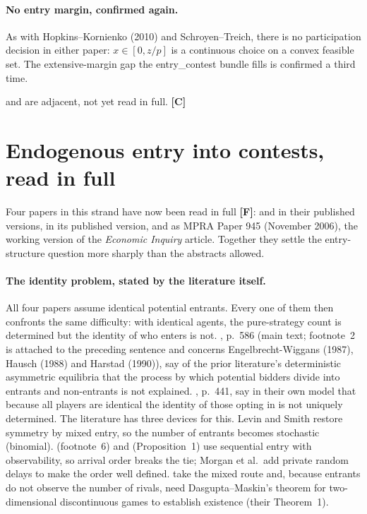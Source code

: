 \documentclass[11pt,a4paper]{article}
\begin{document}
\paragraph{No entry margin, confirmed again.} As with Hopkins--Kornienko
(2010) and Schroyen--Treich, there is no participation decision in either
paper: $x \in [0, z/p]$ is a continuous choice on a convex feasible set. The
extensive-margin gap the entry\_contest bundle fills is confirmed a third time.

\citet{Hopkins2012} and \citet{Hopkins2008} are adjacent, not yet read in full.
\textbf{[C]}

\section{Endogenous entry into contests, read in full}
\label{sec:entry}

Four papers in this strand have now been read in full \textbf{[F]}:
\citet{LevinSmith1994} and \citet{MorganOrzenSefton2012} in their published
versions, \citet{FuJiaoLu2015} in its published version, and \citet{FuLu2010}
as MPRA Paper 945 (November 2006), the working version of the \emph{Economic
Inquiry} article. Together they settle the entry-structure question more
sharply than the abstracts allowed.

\paragraph{The identity problem, stated by the literature itself.} All four
papers assume identical potential entrants. Every one of them then confronts the
same difficulty: with identical agents, the pure-strategy count is determined
but the identity of who enters is not. \citet{LevinSmith1994}, p.~586 (main
text; footnote~2 is attached to the preceding sentence and concerns
Engelbrecht-Wiggans (1987), Hausch (1988) and Harstad (1990)), say of the
prior literature's deterministic asymmetric
equilibria that the process by which potential bidders divide into entrants and
non-entrants is not explained. \citet{MorganOrzenSefton2012}, p.~441, say in their own model that
because all players are identical the identity of those opting in is not
uniquely determined. The literature has three devices for this. Levin and Smith
restore symmetry by mixed entry, so the number of entrants becomes stochastic
(binomial). \citet{FuLu2010} (footnote~6) and \citet{MorganOrzenSefton2012}
(Proposition~1) use sequential entry with observability, so arrival order breaks
the tie; Morgan et al.\ add private random delays to make the order well
defined. \citet{FuJiaoLu2015} take the mixed route and, because entrants do not
observe the number of rivals, need Dasgupta--Maskin's theorem for
two-dimensional discontinuous games to establish existence (their Theorem~1).
\end{document}
